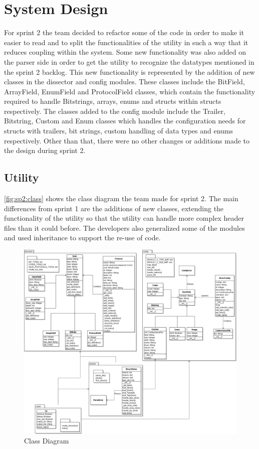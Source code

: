 \section{System Design}
For sprint 2 the team decided to refactor some of the code in order to make it easier to read and to split the functionalities of the \gls{utility} in such a way that it reduces coupling within the system. Some new functionality was also added on the \gls{parser} side in order to get the \gls{utility} to recognize the datatypes mentioned in the sprint 2 backlog. This new functionality is represented by the addition of new classes in the \gls{dissector} and config modules. These classes include the BitField, ArrayField, EnumField and ProtocolField classes, which contain the functionality required to handle Bitstrings, \glspl{array}, \glspl{enum} and \glspl{struct} within \glspl{struct} respectively. The classes added to the config module include the Trailer, Bitstring, Custom and Enum classes which handles the configuration needs for \glspl{struct} with \gls{trailers}, \glspl{bit string}, custom handling of data types and \glspl{enum} respectively. Other than that, there were no other changes or additions made to the design during sprint 2.

\subsection{Utility}
\autoref{fig:sp2:class} shows the class diagram the team made for sprint 2. The main differences from sprint 1 are the additions of new classes, extending the functionality of the \gls{utility} so that the \gls{utility} can handle more complex \gls{header} files than it could before. The developers also generalized some of the modules and used inheritance to support the re-use of code.
 
\begin{figure}[!htb]
	\center
	\includegraphics[width=\textwidth]{./sprints/img/class_diagram_s2}
	\caption{Class Diagram\label{fig:sp2:class}}
\end{figure}

